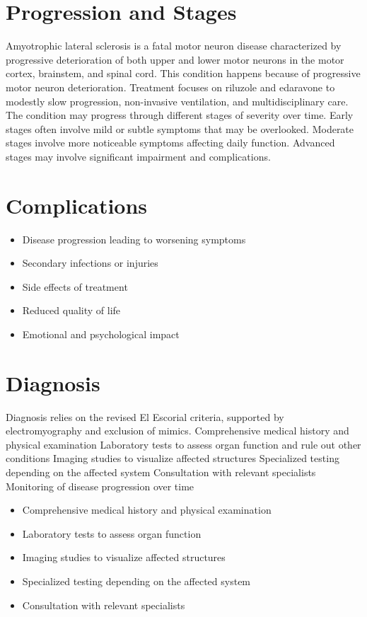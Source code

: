 \section{Progression and Stages}
Amyotrophic lateral sclerosis is a fatal motor neuron disease characterized by progressive deterioration of both upper and lower motor neurons in the motor cortex, brainstem, and spinal cord. This condition happens because of progressive motor neuron deterioration. Treatment focuses on riluzole and edaravone to modestly slow progression, non-invasive ventilation, and multidisciplinary care. The condition may progress through different stages of severity over time. Early stages often involve mild or subtle symptoms that may be overlooked. Moderate stages involve more noticeable symptoms affecting daily function. Advanced stages may involve significant impairment and complications.
\section{Complications}
\begin{itemize}[noitemsep]
  \item Disease progression leading to worsening symptoms
  \item Secondary infections or injuries
  \item Side effects of treatment
  \item Reduced quality of life
  \item Emotional and psychological impact
\end{itemize}
\section{Diagnosis}
Diagnosis relies on the revised El Escorial criteria, supported by electromyography and exclusion of mimics. Comprehensive medical history and physical examination Laboratory tests to assess organ function and rule out other conditions Imaging studies to visualize affected structures Specialized testing depending on the affected system Consultation with relevant specialists Monitoring of disease progression over time

\begin{itemize}[noitemsep]
  \item Comprehensive medical history and physical examination
  \item Laboratory tests to assess organ function
  \item Imaging studies to visualize affected structures
  \item Specialized testing depending on the affected system
  \item Consultation with relevant specialists
\end{itemize}
